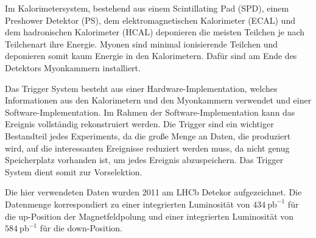 Im Kalorimetersystem, bestehend aus einem Scintillating Pad (SPD), einem
Preshower Detektor (PS), dem elektromagnetischen Kalorimeter (ECAL) und
dem hadronischen Kalorimeter (HCAL) deponieren die meisten Teilchen je nach Teilchenart
ihre Energie. Myonen sind minimal ionisierende Teilchen und deponieren somit kaum
Energie in den Kalorimetern. Dafür sind am Ende des Detektors Myonkammern installiert. \par

Das Trigger System besteht aus einer Hardware-Implementation, welches Informationen aus
den Kalorimetern und den Myonkammern verwendet und einer Software-Implementation. Im
Rahmen der Software-Implementation kann das Ereignis vollständig rekonstruiert werden.
Die Trigger sind ein wichtiger Bestandteil jedes Experiments, da die große Menge an
Daten, die produziert wird, auf die interessanten Ereignisse reduziert werden muss,
da nicht genug Speicherplatz vorhanden ist, um jedes Ereignis abzuspeichern. Das Trigger
System dient somit zur Vorselektion. \par

Die hier verwendeten Daten wurden 2011 am LHCb Detekor aufgezeichnet. Die Datenmenge
korrespondiert zu einer integrierten Luminosität von $\SI{434}{\pico\barn}^{-1}$ für
die up-Position der Magnetfeldpolung und einer integrierten Luminosität von
$\SI{584}{\pico\barn}^{-1}$ für die down-Position.
